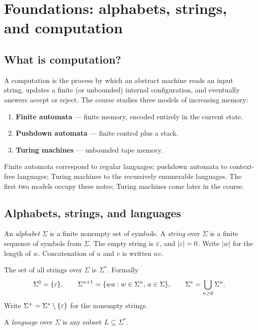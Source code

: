 \section{Foundations: alphabets, strings, and computation}

\subsection{What is computation?}
A computation is the process by which an abstract machine reads an input
string, updates a finite (or unbounded) internal configuration, and eventually
answers accept or reject. The course studies three models of
increasing memory:
\begin{enumerate}
  \item \textbf{Finite automata} --- finite memory, encoded entirely in the
        current state.
  \item \textbf{Pushdown automata} --- finite control plus a stack.
  \item \textbf{Turing machines} --- unbounded tape memory.
\end{enumerate}
Finite automata correspond to regular languages; pushdown automata to
context-free languages; Turing machines to the recursively enumerable languages.
The first two models occupy these notes; Turing machines come later in the
course.

\subsection{Alphabets, strings, and languages}
\begin{definition}
An \emph{alphabet} $\Sigma$ is a finite nonempty set of symbols. A
\emph{string} over $\Sigma$ is a finite sequence of symbols from $\Sigma$.
The empty string is $\varepsilon$, and $|\varepsilon|=0$. Write $|w|$ for the length of
$w$. Concatenation of $u$ and $v$ is written $uv$.
\end{definition}

The set of all strings over $\Sigma$ is $\Sigma^*$. Formally
\[
  \Sigma^0=\{\varepsilon\},\qquad
  \Sigma^{n+1}=\{wa:w\in\Sigma^n,\,a\in\Sigma\},\qquad
  \Sigma^*=\bigcup_{n\geq 0}\Sigma^n.
\]
Write $\Sigma^+=\Sigma^*\setminus\{\varepsilon\}$ for the nonempty strings.

\begin{definition}[Language]
A \emph{language} over $\Sigma$ is any subset $L\subseteq\Sigma^*$.
\end{definition}


